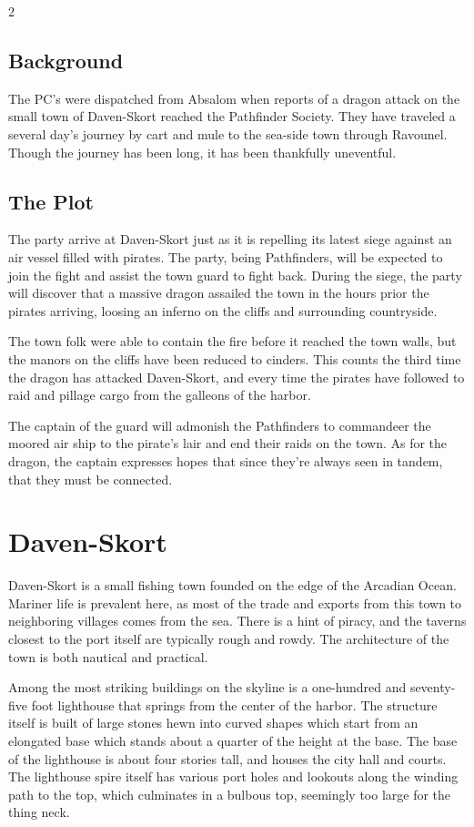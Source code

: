 \begin{multicols}{2}
  \subsection{Background}
  The PC's were dispatched from Absalom when reports of a dragon attack on the small town of Daven-Skort reached the Pathfinder Society. They have traveled a several day's journey by cart and mule to the sea-side town through Ravounel. Though the journey has been long, it has been thankfully uneventful.
  
  \subsection{The Plot}
  The party arrive at Daven-Skort just as it is repelling its latest siege against an air vessel filled with pirates. The party, being Pathfinders, will be expected to join the fight and assist the town guard to fight back. During the siege, the party will discover that a massive dragon assailed the town in the hours prior the pirates arriving, loosing an inferno on the cliffs and surrounding countryside. 
  
  The town folk were able to contain the fire before it reached the town walls, but the manors on the cliffs have been reduced to cinders. This counts the third time the dragon has attacked Daven-Skort, and every time the pirates have followed to raid and pillage cargo from the galleons of the harbor.

  The captain of the guard will admonish the Pathfinders to commandeer the moored air ship to the pirate's lair and end their raids on the town. As for the dragon, the captain expresses hopes that since they're always seen in tandem, that they must be connected.
  
  \section{Daven-Skort}
  Daven-Skort is a small fishing town founded on the edge of the Arcadian Ocean. Mariner life is prevalent here, as most of the trade and exports from this town to neighboring villages comes from the sea. There is a hint of piracy, and the taverns closest to the port itself are typically rough and rowdy. The architecture of the town is both nautical and practical. 
  
  Among the most striking buildings on the skyline is a one-hundred and seventy-five foot lighthouse that springs from the center of the harbor. The structure itself is built of large stones hewn into curved shapes which start from an elongated base which stands about a quarter of the height at the base. The base of the lighthouse is about four stories tall, and houses the city hall and courts. The lighthouse spire itself has various port holes and lookouts along the winding path to the top, which culminates in a bulbous top, seemingly too large for the thing neck. 


\end{multicols}
